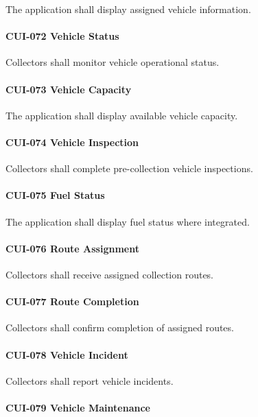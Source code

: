 The application shall display assigned vehicle information.

\paragraph{CUI-072 Vehicle Status}

Collectors shall monitor vehicle operational status.

\paragraph{CUI-073 Vehicle Capacity}

The application shall display available vehicle capacity.

\paragraph{CUI-074 Vehicle Inspection}

Collectors shall complete pre-collection vehicle inspections.

\paragraph{CUI-075 Fuel Status}

The application shall display fuel status where integrated.

\paragraph{CUI-076 Route Assignment}

Collectors shall receive assigned collection routes.

\paragraph{CUI-077 Route Completion}

Collectors shall confirm completion of assigned routes.

\paragraph{CUI-078 Vehicle Incident}

Collectors shall report vehicle incidents.

\paragraph{CUI-079 Vehicle Maintenance}


